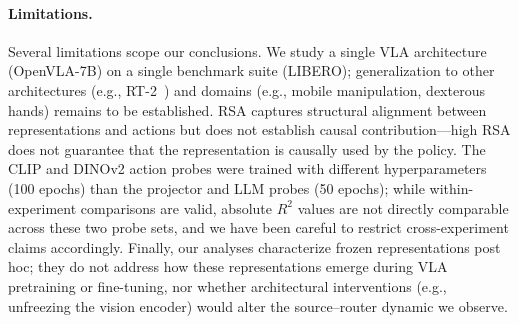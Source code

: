 \paragraph{Limitations.}
Several limitations scope our conclusions.
We study a single VLA architecture (OpenVLA-7B) on a single benchmark suite (LIBERO); generalization to other architectures (e.g., RT-2~\cite{brohan2023_rt2}) and domains (e.g., mobile manipulation, dexterous hands) remains to be established.
RSA captures structural alignment between representations and actions but does not establish causal contribution---high RSA does not guarantee that the representation is causally used by the policy.
The CLIP and DINOv2 action probes were trained with different hyperparameters (100 epochs) than the projector and LLM probes (50 epochs); while within-experiment comparisons are valid, absolute $R^2$ values are not directly comparable across these two probe sets, and we have been careful to restrict cross-experiment claims accordingly.
Finally, our analyses characterize frozen representations post hoc; they do not address how these representations emerge during VLA pretraining or fine-tuning, nor whether architectural interventions (e.g., unfreezing the vision encoder) would alter the source--router dynamic we observe.

